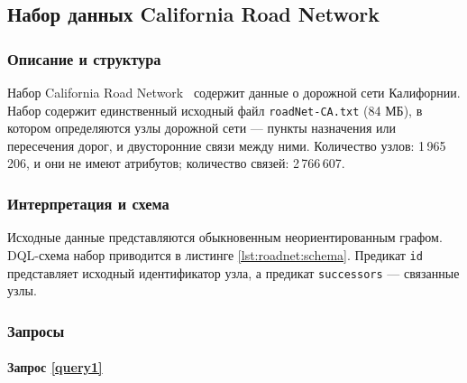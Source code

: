 
\subsection{Набор данных California Road Network}

\subsubsection{Описание и структура}

Набор California Road Network~\cite{roadnet} содержит данные о дорожной сети Калифорнии. Набор содержит единственный
исходный файл \texttt{roadNet-CA.txt} (84 МБ), в котором определяются узлы дорожной сети --- пункты назначения или
пересечения дорог, и двусторонние связи между ними. Количество узлов: 1\,965\,206, и они не имеют атрибутов; количество
связей: 2\,766\,607.

\subsubsection{Интерпретация и схема}

Исходные данные представляются обыкновенным неориентированным графом. DQL-схема набор приводится в листинге
\ref{lst:roadnet:schema}. Предикат \texttt{id} представляет исходный идентификатор узла, а предикат \texttt{successors}
--- связанные узлы.


\subsubsection{Запросы}

\paragraph{Запрос \ref{query1}}


